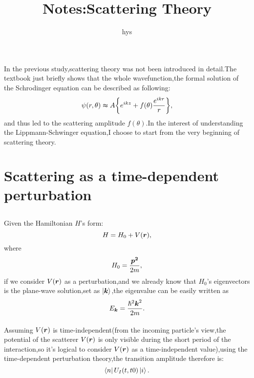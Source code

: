 \documentclass{article}
\author{hys}
\title{Notes:Scattering Theory}
\date{}
\begin{document}
\maketitle
\paragraph{}
In the previous study,scattering theory was not been introduced in detail.The textbook just briefly shows that the whole wavefunction,the formal solution of the Schrodinger equation can be described as following:
\begin{equation}
\psi\pqty{r,\theta}\thickapprox A\Bqty{e^{ikz}+f\pqty{\theta}\frac{e^{ikr}}{r}},
\end{equation}
and thus led to the scattering amplitude $f(\theta)$.In the interest of understanding the Lippmann-Schwinger equation,I choose to start from the very beginning of scattering theory.

\section{Scattering as a time-dependent perturbation}

\subsection{}
\paragraph{}
Given the Hamiltonian $H$'s form:
$$
H=H_0+V(\vb*{r}),
$$
where    $$H_0=\frac{\vb*{p^2}}{2m},$$
if we consider $V(\vb*{r})$ as a perturbation,and we already know that $H_0$'s eigenvectors is the plane-wave solution,set as $\ket{\vb*{k}}$,the eigenvalue can be easily written as $$E_{\vb*{k}}=\frac{\hbar^2\vb*{k}^2}{2m}.$$
\paragraph{}
Assuming $V\pqty{\vb*{r}}$ is time-independent(from the incoming particle's view,the potential of the scatterer $V(\vb*{r})$ is only visible during the short period of the interaction,so it's logical to consider $V(\vb*{r})$ as a time-independent value),using the time-dependent perturbation theory,the transition amplitude therefore is:
\begin{equation}\label{}
  \bra{n}U_I(t,t0)\ket{i}.
\end{equation}
\end{document}
